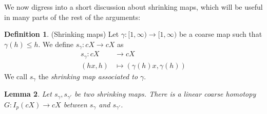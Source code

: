 \documentclass[a4paper,11pt]{article}
\theoremstyle{definition}
\newtheorem{definition}{Definition}[section]
\theoremstyle{plain}
\newtheorem{lemma}[definition]{Lemma}
\theoremstyle{remark}
\begin{document}
We now digress into a short discussion about shrinking maps, which will be useful in many parts of the rest of the arguments:


\begin{definition} (Shrinking maps) Let $\gamma: [1,\infty)\rightarrow [1,\infty)$ be a coarse map such that $\gamma(h)\leq h$. We define $s_{\gamma}: cX\rightarrow cX$ as
\begin{align*}
s_{\gamma}: cX&\rightarrow cX\\
(hx,h)&\mapsto (\gamma(h)x, \gamma(h))
\end{align*}
We call $s_{\gamma}$ the \textit{shrinking map associated to $\gamma$}. 
\end{definition}

\begin{lemma} \label{shrinkindep} Let $s_{\gamma},s_{\gamma'}$ be two shrinking maps. There is a linear coarse homotopy $G: I_{p}(cX)\rightarrow cX$ between $s_{\gamma}$ and $s_{\gamma'}$.
\end{lemma}
\end{document}
